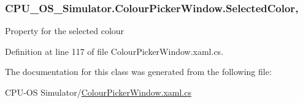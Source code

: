 \subsubsection[{Selected\+Color}]{ C\+P\+U\+\_\+\+O\+S\+\_\+\+Simulator.\+Colour\+Picker\+Window.\+Selected\+Color\hspace{0.3cm}{\ttfamily [get]}, {\ttfamily [set]}}\label{class_c_p_u___o_s___simulator_1_1_colour_picker_window_a4e51070f2e58d178bf773acb4200e76e}


Property for the selected colour 



Definition at line 117 of file Colour\+Picker\+Window.\+xaml.\+cs.



The documentation for this class was generated from the following file\+:\begin{DoxyCompactItemize}
\item 
C\+P\+U-\/\+O\+S Simulator/\hyperlink{_colour_picker_window_8xaml_8cs}{Colour\+Picker\+Window.\+xaml.\+cs}\end{DoxyCompactItemize}
